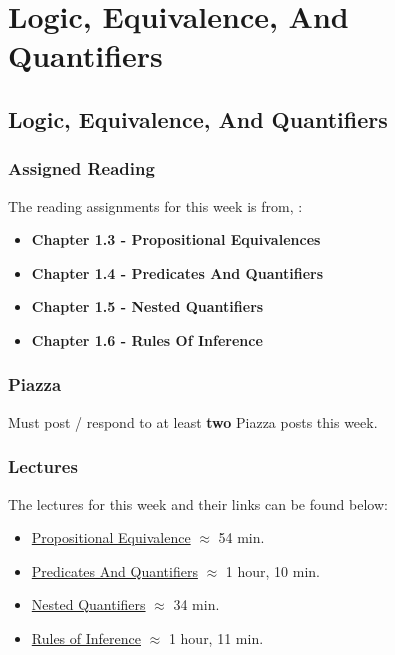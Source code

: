 \clearpage

\renewcommand{\ChapTitle}{Logic, Equivalence, And Quantifiers}
\renewcommand{\SectionTitle}{Logic, Equivalence, And Quantifiers}

\chapter{\ChapTitle}
\section{\SectionTitle}

\subsection{Assigned Reading}

The reading assignments for this week is from, \Textbook:

\begin{itemize}
    \item \textbf{Chapter 1.3 - Propositional Equivalences}
    \item \textbf{Chapter 1.4 - Predicates And Quantifiers}
    \item \textbf{Chapter 1.5 - Nested Quantifiers}
    \item \textbf{Chapter 1.6 - Rules Of Inference}
\end{itemize}

\subsection{Piazza}

Must post / respond to at least \textbf{two} Piazza posts this week.

\subsection{Lectures}

The lectures for this week and their links can be found below:

\begin{itemize}
    \item \href{https://applied.cs.colorado.edu/mod/hvp/view.php?id=51566}{Propositional Equivalence} $\approx$ 54 min.
    \item \href{https://applied.cs.colorado.edu/mod/hvp/view.php?id=51567}{Predicates And Quantifiers} $\approx$ 1 hour, 10 min.
    \item \href{https://applied.cs.colorado.edu/mod/hvp/view.php?id=51568}{Nested Quantifiers} $\approx$ 34 min.
    \item \href{https://applied.cs.colorado.edu/mod/hvp/view.php?id=51569}{Rules of Inference} $\approx$ 1 hour, 11 min.
\end{itemize}

